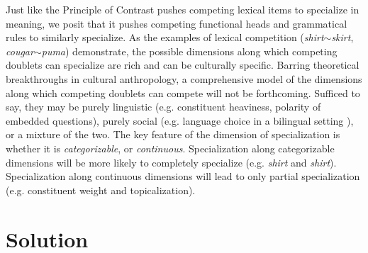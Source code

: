 Just like the Principle of Contrast pushes competing lexical items to specialize in meaning, we posit that it pushes competing functional heads and grammatical rules to similarly specialize.
As the examples of lexical competition (\textsl{shirt}$\sim$\textsl{skirt}, \textsl{cougar}$\sim$\textsl{puma}) demonstrate, the possible dimensions along which competing doublets can specialize are rich and can be culturally specific.
Barring theoretical breakthroughs in cultural anthropology, a comprehensive model of the dimensions along which competing doublets can compete will not be forthcoming.
Sufficed to say, they may be purely linguistic (e.g. constituent heaviness, polarity of embedded questions), purely social (e.g. language choice in a bilingual setting ), or a mixture of the two.
The key feature of the dimension of specialization is whether it is \emph{categorizable}, or \emph{continuous}.
Specialization along categorizable dimensions will be more likely to completely specialize (e.g. \textsl{shirt} and \textsl{shirt}).
Specialization along continuous dimensions will lead to only partial specialization (e.g. constituent weight and topicalization).


\section{Solution}
\label{solution}

